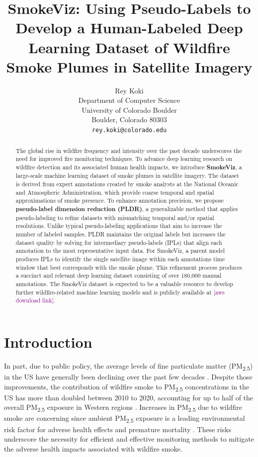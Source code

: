 \documentclass{article}
\title{SmokeViz: Using Pseudo-Labels to Develop a Human-Labeled Deep Learning Dataset of Wildfire Smoke Plumes in Satellite Imagery}
\author{%
  Rey Koki\\%
  Department of Computer Science\\
  University of Colorado Boulder\\
  Boulder, Colorado 80303\\
  \texttt{rey.koki@colorado.edu} \\
}
\newcommand\reynotes[1]{\textcolor{purple}{#1}}
\begin{document}
\maketitle


\begin{abstract}
    The global rise in wildfire frequency and intensity over the past decade underscores the need for improved fire monitoring techniques. To advance deep learning research on wildfire detection and its associated human health impacts, we introduce \textbf{SmokeViz}, a large-scale machine learning dataset of smoke plumes in satellite imagery. The dataset is derived from expert annotations created by smoke analysts at the National Oceanic and Atmospheric Administration, which provide coarse temporal and spatial approximations of smoke presence. To enhance annotation precision, we propose \textbf{pseudo-label dimension reduction (PLDR)}, a generalizable method that applies pseudo-labeling to refine datasets with mismatching temporal and/or spatial resolutions. Unlike typical pseudo-labeling applications that aim to increase the number of labeled samples, PLDR maintains the original labels but increases the dataset quality by solving for intermediary pseudo-labels (IPLs) that align each annotation to the most representative input data. For SmokeViz, a parent model produces IPLs to identify the single satellite image within each annotations time window that best corresponds with the smoke plume. This refinement process produces a succinct and relevant deep learning dataset consisting of over 180,000 manual annotations. The SmokeViz dataset is expected to be a valuable resource to develop further wildfire-related machine learning models and is publicly available at \reynotes{[aws download link]}.  
\end{abstract}


\section{Introduction}

In part, due to public policy, the average levels of fine particulate matter (PM\textsubscript{2.5}) in the US have generally been declining over the past few decades \cite{clean_air_act}. Despite those improvements, the contribution of wildfire smoke to PM\textsubscript{2.5} concentrations in the US has more than doubled between 2010 to 2020, accounting for up to half of the overall PM\textsubscript{2.5} exposure in Western regions \cite{smoke_PM}. Increases in PM\textsubscript{2.5} due to wildfire smoke are concerning since ambient PM\textsubscript{2.5} exposure is a leading environmental risk factor for adverse health effects and premature mortality \cite{smoke_mortality}. These risks underscore the necessity for efficient and effective monitoring methods to mitigate the adverse health impacts associated with wildfire smoke. 
\end{document}
